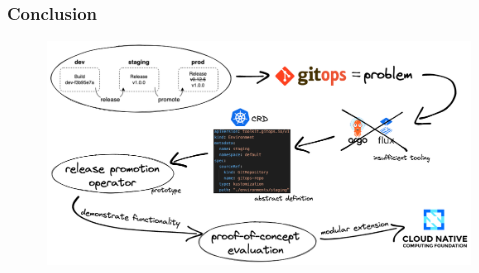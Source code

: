 \documentclass{beamer}
\begin{document}
\begin{frame}
\frametitle{Conclusion}

\begin{figure}[h]
	\centering
	\includegraphics[width=1.0\linewidth]{assets/conclusion-gitops-thesis.png}
	\label{fig:conclusionGitopsThesis}	
\end{figure}

	
\end{frame}
\end{document}
